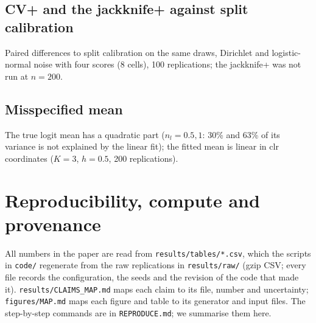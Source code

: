 \subsection{CV+ and the jackknife+ against split calibration}\label{app:c12}
Paired differences to split calibration on the same draws, Dirichlet and logistic-normal noise with four scores (8 cells), 100 replications; the jackknife+ was not run at $n=200$.
\begin{table}[!ht]
  \centering
  \caption{CV+ and jackknife+ minus split: median and range over the 8 cells, and the number of cells whose paired 95\% interval lies below or above zero, for marginal coverage, worst $x_0$-decile coverage and $\log_{10}$ volume ratio. Source: \texttt{A5\_paired\_vs\_split.csv}; \texttt{tables/tab\_c12\_cvplus.py}.}
  \label{tab:c12}
  \scriptsize
  
\end{table}

\FloatBarrier
\subsection{Misspecified mean}\label{app:c14}
The true logit mean has a quadratic part ($n_l=0.5,1$: 30\% and 63\% of its variance is not explained by the linear fit); the fitted mean is linear in clr coordinates ($K=3$, $h=0.5$, 200 replications).
\begin{table}[!ht]
  \centering
  \caption{Misspecified mean. Range over the 15 scores of the true marginal coverage and of the increase in $\log_{10}$ volume ratio against correct specification, Kendall $\tau$ between the ranking of the scores under misspecification and under correct specification (by volume, worst $x_0$ decile, worst boundary stratum), and the best score by volume. Source: \texttt{A6\_summary.csv}, \texttt{A6\_vs\_A1.csv}, \texttt{A6\_rank\_agreement.csv}; \texttt{tables/tab\_c14\_misspec.py}.}
  \label{tab:c14}
  \scriptsize
  
\end{table}

\section{Reproducibility, compute and provenance}\label{app:repro}
All numbers in the paper are read from \texttt{results/tables/*.csv}, which the scripts in \texttt{code/} regenerate from the raw replications in \texttt{results/raw/} (gzip CSV; every file records the configuration, the seeds and the revision of the code that made it). \texttt{results/CLAIMS\_MAP.md} maps each claim to its file, number and uncertainty; \texttt{figures/MAP.md} maps each figure and table to its generator and input files. The step-by-step commands are in \texttt{REPRODUCE.md}; we summarise them here.

